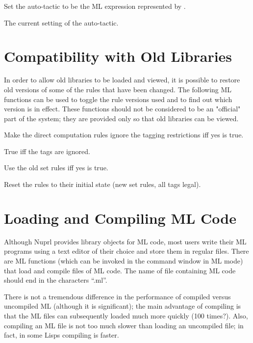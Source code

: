 Set the auto-tactic to be the ML expression represented by .

The current setting of the auto-tactic.





\section{Compatibility with Old Libraries}

In order to allow old libraries to be loaded and viewed, it is possible
to restore old versions of some of the rules that have been changed.
The following ML functions can be used to toggle the rule versions used
and to find out which version is in effect.  These functions should not
be considered to be an "official" part of the system; they are provided
only so that old libraries can be viewed.

  Make the direct computation rules
ignore the tagging restrictions iff yes is true.  

  True iff the tags are ignored.

  Use the old set rules iff yes is
true.



  Reset the rules to their initial state
(new set rules, all tags legal).






\section{Loading and Compiling ML Code}


Although Nuprl provides library objects for ML code, most users write
their ML programs using a text editor of their choice and store them in
regular files.  There are ML functions (which can be invoked in the
command window in ML mode) that load and compile files of ML code.  The
name of file containing ML code should end in the characters ``.ml''.

There is not a tremendous difference in the performance of compiled versus
uncompiled ML (although it is significant); the main advantage of compiling
is that the ML files can subsequently loaded much more quickly (100
times?).  Also, compiling an ML file is not too much slower than loading an
uncompiled file; in fact, in some Lisps compiling is faster.  

